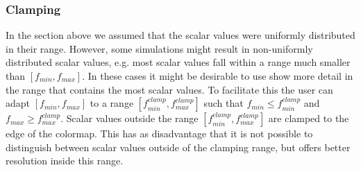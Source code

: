 \subsubsection{Clamping} %
\label{ssub:clamping}
In the section above we assumed that the scalar values were uniformly distributed in their range. However, some simulations might result in non-uniformly distributed scalar values, e.g. most scalar values fall within a range much smaller than $[f_{min}, f_{max}]$. In these cases it might be desirable to use show more detail in the range that contains the most scalar values. To facilitate this the user can adapt $[f_{min}, f_{max}]$ to a range $[f^{clamp}_{min}, f^{clamp}_{max}]$ such that $f_{min} \leq f^{clamp}_{min}$ and $f_{max} \geq f^{clamp}_{max}$. Scalar values outside the range $[f^{clamp}_{min}, f^{clamp}_{max}]$ are clamped to the edge of the colormap. This has as disadvantage that it is not possible to distinguish between scalar values outside of the clamping range, but offers better resolution inside this range.



